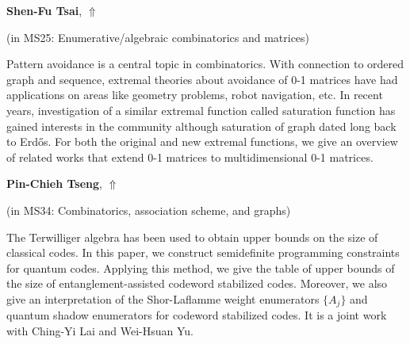 \documentclass[ILAS2025-program.tex]{subfiles}
\begin{document}
\hypertarget{down0370}{}\begin{ilasabstract}
    
\textbf{Shen-Fu Tsai},  \hfill \hyperlink{up0370}{$\Uparrow$}
    
    
(in {\color{mstitle}MS25: Enumerative/algebraic combinatorics and matrices})
        
\mtskip
    Pattern avoidance is a central topic in combinatorics. With connection to ordered graph and sequence, extremal theories about avoidance of 0-1 matrices have had applications on areas like geometry problems, robot navigation, etc. In recent years, investigation of a similar extremal function called saturation function has gained interests in the community although saturation of graph dated long back to Erd\H{o}s. For both the original and new extremal functions, we give an overview of related works that extend 0-1 matrices to multidimensional 0-1 matrices.

\end{ilasabstract}
    

\hypertarget{down0288}{}\begin{ilasabstract}
    
\textbf{Pin-Chieh Tseng},  \hfill \hyperlink{up0288}{$\Uparrow$}
    
    
(in {\color{mstitle}MS34: Combinatorics, association scheme, and graphs})
        
\mtskip
    The Terwilliger algebra has been used to obtain upper bounds on the size of classical codes. In this paper, we construct semidefinite programming constraints for quantum codes. Applying this method, we give the table of upper bounds of the size of entanglement-assisted codeword stabilized codes. Moreover, we also give an interpretation of the Shor-Laflamme weight enumerators $\{A_{j}\}$ and quantum shadow enumerators for codeword stabilized codes. It is a joint work with Ching-Yi Lai and Wei-Hsuan Yu.

\end{ilasabstract}
    
\end{document}
